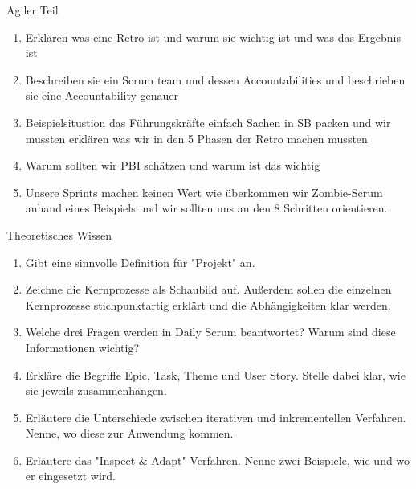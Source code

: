 \documentclass{article}
\begin{document}
\begin{exercise}{Agiler Teil}
  \begin{enumerate}
    \item Erklären was eine Retro ist und warum sie wichtig ist und was das Ergebnis ist
    \item Beschreiben sie ein Scrum team und dessen Accountabilities und beschrieben sie eine Accountability genauer
    \item Beispielsitustion das Führungskräfte einfach Sachen in SB packen und wir mussten erklären was wir in den 5 Phasen der Retro machen mussten
    \item Warum sollten wir PBI schätzen und warum ist das wichtig
    \item Unsere Sprints machen keinen Wert wie überkommen wir Zombie-Scrum anhand eines Beispiels und wir sollten uns an den 8 Schritten orientieren.
  \end{enumerate}
\end{exercise}

\begin{exercise}{Theoretisches Wissen}
  \begin{enumerate}
    \item Gibt eine sinnvolle Definition für "Projekt" an.
    \item Zeichne die Kernprozesse als Schaubild auf. Außerdem sollen die einzelnen Kernprozesse stichpunktartig erklärt und die Abhängigkeiten klar werden.
    \item Welche drei Fragen werden in Daily Scrum beantwortet? Warum sind diese Informationen wichtig?
    \item Erkläre die Begriffe Epic, Task, Theme und User Story. Stelle dabei klar, wie sie jeweils zusammenhängen.
    \item Erläutere die Unterschiede zwischen iterativen und inkrementellen Verfahren. Nenne, wo diese zur Anwendung kommen.
    \item Erläutere das "Inspect \& Adapt" Verfahren. Nenne zwei Beispiele, wie und wo er eingesetzt wird.
  \end{enumerate}
\end{exercise}
\end{document}
